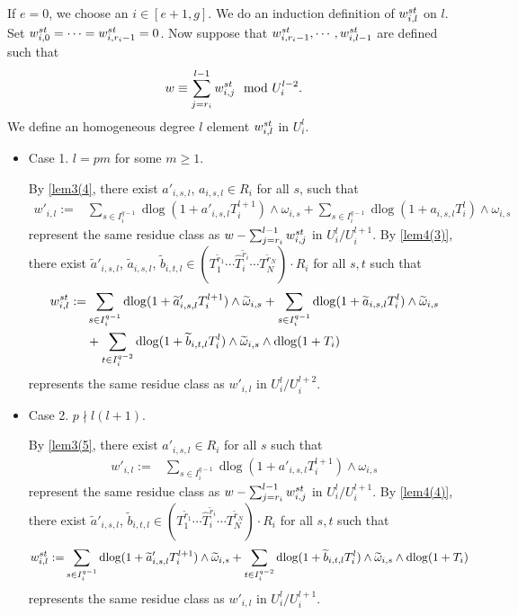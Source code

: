 \documentclass[11pt]{amsart}
\newcommand{\dlog}{\operatorname{dlog}}
\renewcommand{\hat}{\widehat}
\renewcommand{\tilde}{\widetilde}
\theoremstyle{plain}
\theoremstyle{definition}
\numberwithin{equation}{prop}
\begin{document}
If $e=0$, we choose an $i\in [e+1,g]$.
We do an induction definition of $w_{i,l}^{\rm st}$ on $l$.
Set $w_{i,0}^{\rm st}=\cdots=w_{i,r_i-1}^{\rm st}=0$.
Now suppose that $w_{i,r_i-1}^{\rm st},\cdots, w_{i,l-1}^{\rm st}$ are defined such that
$$w\equiv \sum_{j=r_i}^{l-1} w_{i,j}^{\rm st}\mod U_i^{l-2}.$$
We define an homogeneous degree $l$ element $w_{i,l}^{\rm st}$ in $U_i^l$.
\begin{itemize}
\item 
Case 1. $l=pm$ for some $m\ge 1$.

By \eqref{lem3(4},
there exist $a'_{i,s,l}$, $a_{i,s,l}\in R_i$ for all $s$, such that
\begin{align*}
w'_{i,l}:=&\sum_{s\in I_i^{q-1}} \dlog(1+a'_{i,s,l}T_i^{l+1})\wedge\omega_{i,s}
+
\sum_{s\in I_i^{q-1}} \dlog(1+a_{i,s,l}T_i^{l})\wedge\omega_{i,s}
\end{align*} 
represent the same residue class as $w- \sum_{j=r_i}^{l-1} w_{i,j}^{\rm st}$ in $U_i^{l}/U_i^{l+1}$.
By \eqref{lem4(3)}, 
there exist $\tilde a'_{i,s,l}$, $\tilde a_{i,s,l}$, $\tilde b_{i,t,l}\in 
(T_1^{\tilde r_1}\cdots \hat T_i^{\tilde r_i}\cdots T_N^{\tilde r_N})\cdot R_i$ for all $s,t$ such that
\begin{align*}
w_{i,l}^{\rm st}:=
&\sum_{s\in I_i^{q-1}} 
\dlog(1+\tilde a'_{i,s,l}T_i^{l+1})\wedge\tilde\omega_{i,s}
+
\sum_{s\in I_i^{q-1}} 
\dlog(1+\tilde a_{i,s,l}T_i^{l})\wedge\tilde \omega_{i,s}
\\
&+ \sum_{t\in I_i^{q-2}} 
\dlog(1+\tilde b_{i,t,l}T_i^{l})\wedge\tilde\omega_{i,s}\wedge 
\dlog (1+T_i)
\end{align*}
represents the same residue class as $w'_{i,l}$ in $U_i^{l}/U_i^{l+2}$.

\item 
Case 2. $p\nmid l(l+1)$.

By \eqref{lem3(5},
there exist $a'_{i,s,l}\in R_i$ for all $s$ such that
\begin{align*}
w'_{i,l}:=&\sum_{s\in I_i^{q-1}} \dlog(1+a'_{i,s,l}T_i^{l+1})\wedge\omega_{i,s}
\end{align*} 
represent the same residue class as $w- \sum_{j=r_i}^{l-1} w_{i,j}^{\rm st}$ in $U_i^{l}/U_i^{l+1}$.
By \eqref{lem4(4)}, 
there exist $\tilde a'_{i,s,l}$,  $\tilde b_{i,t,l}\in
(T_1^{\tilde r_1}\cdots \hat T_i^{\tilde r_i}\cdots T_N^{\tilde r_N})\cdot R_i$  for all $s,t$ such that
\begin{align*}
w_{i,l}^{\rm st}:=
&\sum_{s\in I_i^{q-1}} 
\dlog(1+\tilde a'_{i,s,l}T_i^{l+1})\wedge\tilde\omega_{i,s}
+ \sum_{t\in I_i^{q-2}} 
\dlog(1+\tilde b_{i,t,l}T_i^{l})\wedge\tilde\omega_{i,s}\wedge 
\dlog (1+T_i)
\end{align*}
represents the same residue class as $w'_{i,l}$ in $U_i^{l}/U_i^{l+1}$.



\end{itemize}
\end{document}
